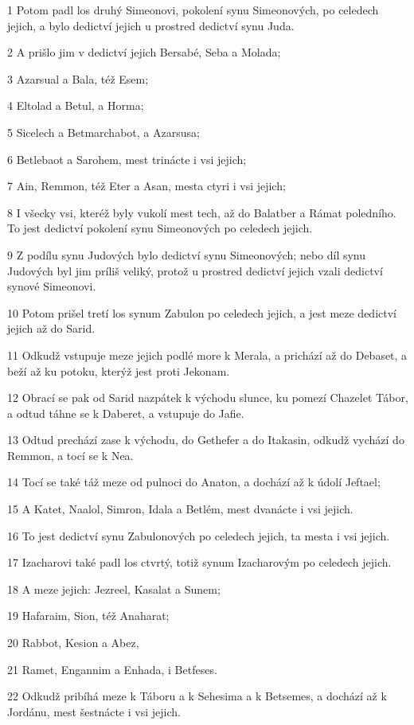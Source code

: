 \par 1 Potom padl los druhý Simeonovi, pokolení synu Simeonových, po celedech jejich, a bylo dedictví jejich u prostred dedictví synu Juda.
\par 2 A prišlo jim v dedictví jejich Bersabé, Seba a Molada;
\par 3 Azarsual a Bala, též Esem;
\par 4 Eltolad a Betul, a Horma;
\par 5 Sicelech a Betmarchabot, a Azarsusa;
\par 6 Betlebaot a Sarohem, mest trinácte i vsi jejich;
\par 7 Ain, Remmon, též Eter a Asan, mesta ctyri i vsi jejich;
\par 8 I všecky vsi, kteréž byly vukolí mest tech, až do Balatber a Rámat poledního. To jest dedictví pokolení synu Simeonových po celedech jejich.
\par 9 Z podílu synu Judových bylo dedictví synu Simeonových; nebo díl synu Judových byl jim príliš veliký, protož u prostred dedictví jejich vzali dedictví synové Simeonovi.
\par 10 Potom prišel tretí los synum Zabulon po celedech jejich, a jest meze dedictví jejich až do Sarid.
\par 11 Odkudž vstupuje meze jejich podlé more k Merala, a prichází až do Debaset, a beží až ku potoku, kterýž jest proti Jekonam.
\par 12 Obrací se pak od Sarid nazpátek k východu slunce, ku pomezí Chazelet Tábor, a odtud táhne se k Daberet, a vstupuje do Jafie.
\par 13 Odtud prechází zase k východu, do Gethefer a do Itakasin, odkudž vychází do Remmon, a tocí se k Nea.
\par 14 Tocí se také táž meze od pulnoci do Anaton, a dochází až k údolí Jeftael;
\par 15 A Katet, Naalol, Simron, Idala a Betlém, mest dvanácte i vsi jejich.
\par 16 To jest dedictví synu Zabulonových po celedech jejich, ta mesta i vsi jejich.
\par 17 Izacharovi také padl los ctvrtý, totiž synum Izacharovým po celedech jejich.
\par 18 A meze jejich: Jezreel, Kasalat a Sunem;
\par 19 Hafaraim, Sion, též Anaharat;
\par 20 Rabbot, Kesion a Abez,
\par 21 Ramet, Engannim a Enhada, i Betfeses.
\par 22 Odkudž pribíhá meze k Táboru a k Sehesima a k Betsemes, a dochází až k Jordánu, mest šestnácte i vsi jejich.

